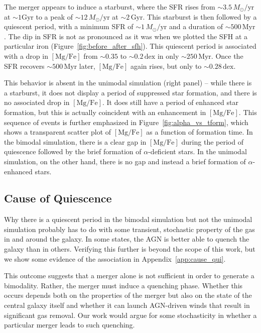 \documentclass[linenumbers, twocolumn]{aastex631}
\newcommand{\Msun}{\ensuremath{M_{\odot}}}
\newcommand{\Gyr}{\ensuremath{\textrm{Gyr}}}
\newcommand{\Myr}{\ensuremath{\textrm{Myr}}}
\newcommand{\MgFe}{\ensuremath{[\textrm{Mg}/\textrm{Fe}]}}
\newcommand{\dex}{\ensuremath{\textrm{dex}}}
\newcommand{\Msunyr}{\ensuremath{\Msun/\textrm{yr}}}
\begin{document}
The merger appears to induce a starburst, where the SFR rises from $\sim3.5\,\Msunyr$ at $\sim1\Gyr$ to a peak of $\sim12\,\Msunyr$ at $\sim2\,\Gyr$. This starburst is then followed by a quiescent period, with a minimum SFR of $\sim1\,\Msunyr$ and a duration of $\sim500\,\Myr$. The dip in SFR is not as pronounced as it was when we plotted the SFH at a particular iron (Figure~\ref{fig:before_after_sfh}). This quiescent period is associated with a drop in \MgFe{} from $\sim0.35$ to $\sim0.2\,\dex$ in only $\sim250\,\Myr$. Once the SFR recovers $\sim500\,\Myr$ later, \MgFe{} again rises, but only to $\sim0.28\,\dex$.

This behavior is absent in the unimodal simulation (right panel) -- while there is a starburst, it does not display a period of suppressed star formation, and there is no associated drop in \MgFe{}. It does still have a period of enhanced star formation, but this is actually coincident with an enhancement in \MgFe{}. This sequence of events is further emphasized in Figure~\ref{fig:alpha_vs_tform}, which shows a transparent scatter plot of \MgFe{} as a function of formation time. In the bimodal simulation, there is a clear gap in \MgFe{} during the period of quiescence followed by the brief formation of $\alpha$-deficient stars. In the unimodal simulation, on the other hand, there is no gap and instead a brief formation of $\alpha$-enhanced stars.

\subsection{Cause of Quiescence}\label{ssec:cause_qui}
Why there is a quiescent period in the bimodal simulation but not the unimodal simulation probably has to do with some transient, stochastic property of the gas in and around the galaxy. In some states, the AGN is better able to quench the galaxy than in others. Verifying this further is beyond the scope of this work, but we show some evidence of the association in Appendix~\ref{app:cause_qui}.

This outcome suggests that a merger alone is not sufficient in order to generate a bimodality. Rather, the merger must induce a quenching phase. Whether this occurs depends both on the properties of the merger but also on the state of the central galaxy itself and whether it can launch AGN-driven winds that result in significant gas removal. Our work would argue for some stochasticity in whether a particular merger leads to such quenching.
\end{document}
